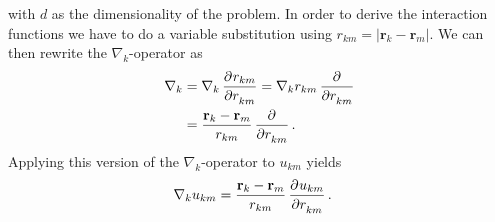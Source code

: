 \documentclass[
    a4paper, aps, twocolumn, floatfix, superscriptaddress, nofootinbib]{revtex4-1}
\newcommand{\vf}{\mathbf}
\newcommand{\1}{\mathds{1}}
\begin{document}
    with $d$ as the dimensionality of the problem.
    In order to derive the interaction functions we have to do a
    variable substitution using $r_{km} = |\vf{r}_k - \vf{r}_m|$. We can
    then rewrite the $\nabla_k$-operator as
    \begin{align}
        \nabla_k
        &=
        \nabla_k
        \dpd[]{r_{km}}{r_{km}}
        =
        \nabla_k r_{km} \dpd[]{}{r_{km}}
        \\
        &=
        \frac{\vf{r}_k - \vf{r}_m}{r_{km}}\dpd[]{}{r_{km}}.
    \end{align}
    Applying this version of the $\nabla_k$-operator to $u_{km}$ yields
    \begin{align}
        \nabla_k u_{km}
        &=
        \frac{\vf{r}_k - \vf{r}_m}{r_{km}}
        \dpd[]{u_{km}}{r_{km}}.
    \end{align}
\end{document}
